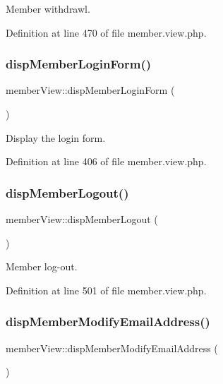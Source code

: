 Member withdrawl. 



Definition at line 470 of file member.\+view.\+php.

\hypertarget{classmemberView_a8406fab6cecc89c49479a61ddffe18cc}{}\label{classmemberView_a8406fab6cecc89c49479a61ddffe18cc} 
\subsubsection{\texorpdfstring{disp\+Member\+Login\+Form()}{dispMemberLoginForm()}}
{\footnotesize\ttfamily member\+View\+::disp\+Member\+Login\+Form (\begin{DoxyParamCaption}{ }\end{DoxyParamCaption})}



Display the login form. 



Definition at line 406 of file member.\+view.\+php.

\hypertarget{classmemberView_a97280f922b67896898bd34f5c2ddc411}{}\label{classmemberView_a97280f922b67896898bd34f5c2ddc411} 
\subsubsection{\texorpdfstring{disp\+Member\+Logout()}{dispMemberLogout()}}
{\footnotesize\ttfamily member\+View\+::disp\+Member\+Logout (\begin{DoxyParamCaption}{ }\end{DoxyParamCaption})}



Member log-\/out. 



Definition at line 501 of file member.\+view.\+php.

\hypertarget{classmemberView_ac89f9f6436c7d195835d091960f5d113}{}\label{classmemberView_ac89f9f6436c7d195835d091960f5d113} 
\subsubsection{\texorpdfstring{disp\+Member\+Modify\+Email\+Address()}{dispMemberModifyEmailAddress()}}
{\footnotesize\ttfamily member\+View\+::disp\+Member\+Modify\+Email\+Address (\begin{DoxyParamCaption}{ }\end{DoxyParamCaption})}



